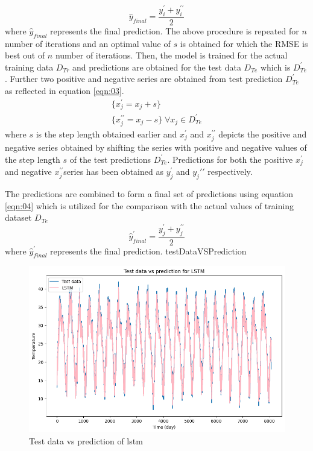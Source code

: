 \documentclass[sn-mathphys,Numbered]{sn-jnl}
\theoremstyle{thmstyleone}
\theoremstyle{thmstyletwo}
\theoremstyle{thmstylethree}
\begin{document}
\begin{equation}
\label{eqn:02}
\hat{y}_{final}=\frac{y_i^{\prime}+y_i^{\prime\prime}}{2}
\end{equation}
where $\hat{y}_{final}$ represents the final prediction. The above procedure is repeated for $n$ number of iterations and an optimal value of $s$ is obtained for which the RMSE is best out of $n$ number of iterations. 
Then, the model is trained for the actual training data $D_{Tr}$ and predictions are obtained for the test data $D_{Te}$ which is $D_{Te}^{\prime}$. Further two positive and negative series are obtained from test prediction $D_{Te}^{\prime}$ as reflected in equation \ref{eqn:03}.
\begin{equation}
\begin{aligned}
\label{eqn:03}
\{x_j^{\prime}=x_j+s\} \\
\{x_j^{\prime\prime}=x_j-s\} \; \forall x_j \in D_{Te}^{\prime}
\end{aligned}
\end{equation}
where $s$ is the step length obtained earlier and $x_j^{\prime}$ and $x_{j}^{\prime\prime}$ depicts the positive and negative series obtained by shifting the series with positive and negative values of the step length $s$ of the test predictions $ D_{Te}^{\prime}$.
Predictions for both the positive $x_j^{\prime}$and negative $x_j^{\prime\prime}$series has been obtained as $y_j^{\prime}$ and $y_j{\prime\prime}$ respectively.

The predictions are combined to form a final set of predictions using equation \ref{eqn:04} which is utilized for the comparison with the actual values of training dataset $D_{Te}$
\begin{equation}
\label{eqn:04}
\hat{y}_{final}^{\prime}=\frac{y_j^{\prime}+y_j^{\prime\prime}}{2}
\end{equation}
where $\hat{y}_{final}^{\prime}$ represents the final prediction.
testDataVSPrediction
\begin{figure}[ht!]
    \centering
    \includegraphics[width=1\textwidth, height=0.9\linewidth]{testDataVSPrediction.png}
    \caption{Test data vs prediction of lstm}
    \label{fig:testDataVSPrediction}
\end{figure}
\end{document}
